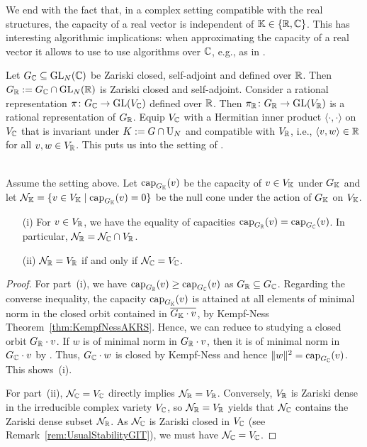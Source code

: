 We end with the fact that, in a complex setting compatible with the real structures, the capacity of a real vector is independent of $\mathbb K \in \{\mathbb R, \mathbb C\}$. This has interesting algorithmic implications: when approximating the capacity of a real vector it allows to use to use algorithms over $\mathbb C$, e.g., as in \cite{GradflowArXiv}.

Let $G_\mathbb C \subseteq \operatorname{GL}_N(\mathbb C)$ be Zariski closed, self-adjoint and defined over $\mathbb R$. Then $G_\mathbb R := G_\mathbb C \cap \operatorname{GL}_N(\mathbb R)$ is Zariski closed and self-adjoint. Consider a rational representation $\pi \colon G_\mathbb C \to \operatorname{GL}(V_\mathbb C)$ defined over $\mathbb R$. Then $\pi_\mathbb R \colon G_\mathbb R \to \operatorname{GL}(V_\mathbb R)$ is a rational representation of $G_\mathbb R$. Equip $V_\mathbb C$ with a Hermitian inner product $\langle \cdot, \cdot \rangle$ on $V_\mathbb C$ that is invariant under $K := G \cap \operatorname{U}_N$ and compatible with $V_\mathbb R$, i.e., $\langle v, w \rangle \in \mathbb R$ for all $v,w \in V_\mathbb R$. This puts us into the setting of \cite[§8]{RichardsonSlodowy}.

\begin{prop} \label{prop:RealVsComplexCapacity}
	\ \\
	Assume the setting above. Let $\operatorname{cap}_{G_\mathbb K}(v)$ be the capacity of $v \in V_\mathbb K$ under $G_{\mathbb K}$ and let $\mathcal{N}_{\mathbb K} = \{ v \in V_\mathbb K \mid \operatorname{cap}_{G_\mathbb K}(v) =0\}$ be the null cone under the action of $G_{\mathbb K}$ on $V_\mathbb K$.
	\begin{itemize}
		\item[(i)] For $v \in V_\mathbb R$, we have the equality of capacities $\operatorname{cap}_{G_\mathbb R}(v) = \operatorname{cap}_{G_\mathbb C}(v)$. In particular, $\mathcal{N}_{\mathbb R} = \mathcal{N}_{\mathbb C} \cap V_\mathbb R$.
		
		\item[(ii)] $\mathcal{N}_{\mathbb R} = V_\mathbb R$ if and only if $\mathcal{N}_{\mathbb C} = V_\mathbb C$.
	\end{itemize}
\end{prop}

\begin{proof}
	For part~(i), we have $\operatorname{cap}_{G_\mathbb R}(v) \geq \operatorname{cap}_{G_\mathbb C}(v)$ as $G_\mathbb R \subseteq G_\mathbb C$. Regarding the converse inequality, the capacity 
	$\operatorname{cap}_{G_\mathbb K}(v)$ is attained at all elements of minimal norm in the closed orbit contained in $\overline{G_{\mathbb K} \cdot v}$, by Kempf-Ness Theorem~\ref{thm:KempfNessAKRS}.
	Hence, we can reduce to studying a closed orbit $G_{\mathbb R} \cdot v$.
	If $w$ is of minimal norm in $G_{\mathbb R} \cdot v$, then it is of minimal norm in $G_{\mathbb C} \cdot v$ by  \cite[Lemma~8.1]{RichardsonSlodowy}. Thus, $G_{\mathbb C} \cdot w$ is closed by Kempf-Ness and hence $\|w\|^2 = \operatorname{cap}_{G_\mathbb C}(v)$. This shows~(i).
	
	For part~(ii), $\mathcal{N}_{\mathbb C} = V_\mathbb C$ directly implies $\mathcal{N}_{\mathbb R} = V_\mathbb R$. Conversely, $V_\mathbb R$ is Zariski dense in the irreducible complex variety $V_\mathbb C$, so $\mathcal{N}_\mathbb R = V_\mathbb R$ yields that $\mathcal{N}_\mathbb C$ contains the Zariski dense subset $\mathcal{N}_\mathbb R$. As $\mathcal{N}_\mathbb C$ is Zariski closed in $V_\mathbb C$ (see Remark~\ref{rem:UsualStabilityGIT}), we must have $\mathcal{N}_\mathbb C = V_\mathbb C$.
\end{proof}

